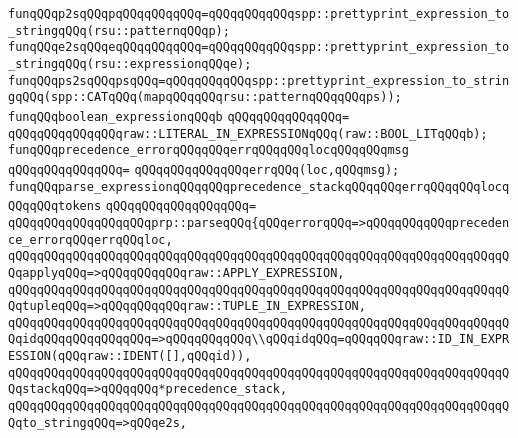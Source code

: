 \verb|funqQQqp2sqQQqpqQQqqQQqqQQq=qQQqqQQqqQQqspp::prettyprint_expression_to_stringqQQq(rsu::patternqQQqp);|\newline
\verb|funqQQqe2sqQQqeqQQqqQQqqQQq=qQQqqQQqqQQqspp::prettyprint_expression_to_stringqQQq(rsu::expressionqQQqe);|\newline
\newline
\verb|funqQQqps2sqQQqpsqQQq=qQQqqQQqqQQqspp::prettyprint_expression_to_stringqQQq(spp::CATqQQq(mapqQQqqQQqrsu::patternqQQqqQQqps));|\newline
\newline
\newline
\verb|funqQQqboolean_expressionqQQqb|\newline
\verb|qQQqqQQqqQQqqQQq=|\newline
\verb|qQQqqQQqqQQqqQQqraw::LITERAL_IN_EXPRESSIONqQQq(raw::BOOL_LITqQQqb);|\newline
\newline
\newline
\verb|funqQQqprecedence_errorqQQqqQQqerrqQQqqQQqlocqQQqqQQqmsg|\newline
\verb|qQQqqQQqqQQqqQQq=|\newline
\verb|qQQqqQQqqQQqqQQqerrqQQq(loc,qQQqmsg);|\newline
\newline
\newline
\verb|funqQQqparse_expressionqQQqqQQqprecedence_stackqQQqqQQqerrqQQqqQQqlocqQQqqQQqtokens|\newline
\verb|qQQqqQQqqQQqqQQqqQQq=|\newline
\verb|qQQqqQQqqQQqqQQqqQQqprp::parseqQQq{qQQqerrorqQQq=>qQQqqQQqqQQqprecedence_errorqQQqerrqQQqloc,|\newline
\verb|qQQqqQQqqQQqqQQqqQQqqQQqqQQqqQQqqQQqqQQqqQQqqQQqqQQqqQQqqQQqqQQqqQQqqQQqapplyqQQq=>qQQqqQQqqQQqraw::APPLY_EXPRESSION,|\newline
\verb|qQQqqQQqqQQqqQQqqQQqqQQqqQQqqQQqqQQqqQQqqQQqqQQqqQQqqQQqqQQqqQQqqQQqqQQqtupleqQQq=>qQQqqQQqqQQqraw::TUPLE_IN_EXPRESSION,|\newline
\verb|qQQqqQQqqQQqqQQqqQQqqQQqqQQqqQQqqQQqqQQqqQQqqQQqqQQqqQQqqQQqqQQqqQQqqQQqidqQQqqQQqqQQqqQQq=>qQQqqQQqqQQq\\qQQqidqQQq=qQQqqQQqraw::ID_IN_EXPRESSION(qQQqraw::IDENT([],qQQqid)),|\newline
\verb|qQQqqQQqqQQqqQQqqQQqqQQqqQQqqQQqqQQqqQQqqQQqqQQqqQQqqQQqqQQqqQQqqQQqqQQqstackqQQq=>qQQqqQQq*precedence_stack,|\newline
\verb|qQQqqQQqqQQqqQQqqQQqqQQqqQQqqQQqqQQqqQQqqQQqqQQqqQQqqQQqqQQqqQQqqQQqqQQqto_stringqQQq=>qQQqe2s,|\newline
